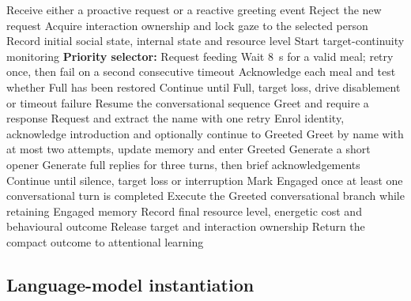 \begin{algorithm}[tbp]
\caption{Behaviour-tree-equivalent social-state and drive-gated executive control}
\label{alg:executive-control}
\small
\begin{algorithmic}[1]
    \STATE Receive either a proactive request or a reactive greeting event
        \STATE Reject the new request
    \ENDIF
    \STATE Acquire interaction ownership and lock gaze to the selected person
    \STATE Record initial social state, internal state and resource level
    \STATE Start target-continuity monitoring
    \STATE \textbf{Priority selector:}
        \STATE Request feeding
        \STATE Wait 8~s for a valid meal; retry once, then fail on a second consecutive timeout
        \STATE Acknowledge each meal and test whether Full has been restored
        \STATE Continue until Full, target loss, drive disablement or timeout failure
            \STATE Resume the conversational sequence
        \ENDIF
    \ELSE
            \STATE Greet and require a response 
            \STATE Request and extract the name with one retry
            \STATE Enrol identity, acknowledge introduction and optionally continue to Greeted
            \STATE Greet by name with at most two attempts, update memory and enter Greeted 
            \STATE Generate a short opener
            \STATE Generate full replies for three turns, then brief acknowledgements
            \STATE Continue until silence, target loss or interruption
            \STATE Mark Engaged once at least one conversational turn is completed
            \STATE Execute the Greeted conversational branch while retaining Engaged memory
        \ENDIF
    \ENDIF
    \STATE Record final resource level, energetic cost and behavioural outcome
    \STATE Release target and interaction ownership
    \STATE Return the compact outcome to attentional learning
\end{algorithmic}
\end{algorithm}

\subsection{Language-model instantiation}
\label{subsec:language-model-instantiation}

